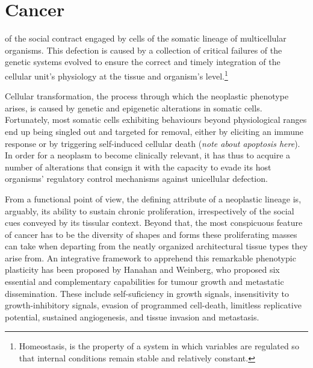 \documentclass{tufte-book}
\begin{document}
\section{Cancer}

 of the social contract engaged by cells of the
somatic lineage of multicellular organisms.  This defection is caused by a
collection of critical failures of the genetic systems evolved to ensure the
correct and timely integration of the cellular unit's physiology at the tissue
and organism's level.\footnote{Homeostasis, is the property of a system in which
  variables are regulated so that internal conditions remain stable and
  relatively constant.}

\bigskip

Cellular transformation, the process through which the neoplastic phenotype
arises, is caused by genetic and epigenetic alterations in somatic cells.
Fortunately, most somatic cells exhibiting behaviours beyond physiological
ranges end up being singled out and targeted for removal, either by eliciting an
immune response or by triggering self-induced cellular death (\emph{note about
  apoptosis here}).  In order for a neoplasm to become clinically relevant, it
has thus to acquire a number of alterations that consign it with the capacity to
evade its host organisms' regulatory control mechanisms against unicellular
defection.



From a functional point of view, the defining attribute of a neoplastic lineage
is, arguably, its ability to sustain chronic proliferation, irrespectively of
the social cues conveyed by its tissular context.  Beyond that, the most
conspicuous feature of cancer has to be the diversity of shapes and forms these
proliferating masses can take when departing from the neatly organized
architectural tissue types they arise from.  An integrative framework to
apprehend this remarkable phenotypic plasticity has been proposed by Hanahan and
Weinberg,\cite{hanahan_hallmarks_2000,hanahan_hallmarks_2011} who proposed six
essential and complementary capabilities for tumour growth and metastatic
dissemination.  These include self-suficiency in growth signals, insensitivity
to growth-inhibitory signals, evasion of programmed cell-death, limitless
replicative potential, sustained angiogenesis, and tissue invasion and
metastasis.
\end{document}
